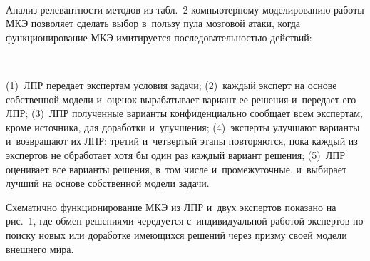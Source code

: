 \begin{figure*} %
 \vspace*{1pt}
\begin{center}
\mbox{%
\epsfxsize=161.799mm
}
\end{center}
\vspace*{-11pt}
\end{figure*}

\begin{multicols}{2}
  
  Анализ релевантности методов из табл.~2 компьютерному моделированию 
работы МКЭ позволяет сделать выбор в~пользу пула мозговой атаки, когда 
функционирование МКЭ имитируется последовательностью действий: 
\begin{figure*}[b] %
\begin{center}
\mbox{%
\epsfxsize=162.625mm
}
\end{center}
\vspace*{-11pt}
\end{figure*}
(1)~ЛПР 
передает экспертам условия задачи; 
(2)~каждый эксперт на основе собственной 
модели и~оценок вырабатывает вариант ее решения и~передает его ЛПР; 
(3)~ЛПР полученные варианты конфиденциально сообщает всем экспертам, 
кроме источника, для доработки и~улучшения; 
(4)~эксперты улучшают 
варианты и~возвращают их ЛПР: третий и~четвертый этапы повторяются, пока 
каждый из экспертов не обработает хотя бы один раз каждый вариант решения; 
(5)~ЛПР оценивает все варианты решения, в~том числе и~промежуточные, 
и~выбирает лучший на основе собственной модели задачи. 

  
  Схематично функционирование МКЭ из ЛПР и~двух экспертов показано на 
рис.~1, где обмен решениями чередуется с~индивидуальной работой экспертов 
по поиску новых или доработке име\-ющих\-ся решений через призму своей 
модели внешнего \mbox{мира}.



\end{multicols}
